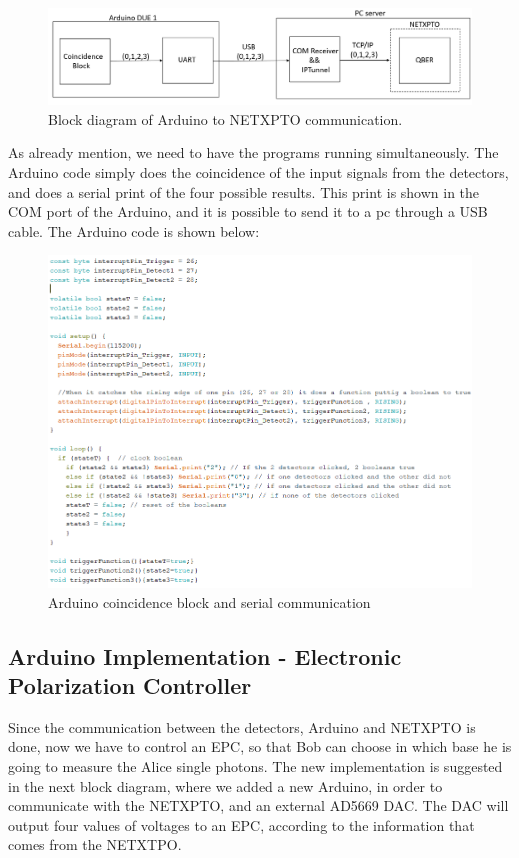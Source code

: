 \begin{refsection}
	\begin{figure}[H]
		\centering
		\includegraphics[width=1.1\linewidth]{./sdf/arduino_quantum_rx/figures/PC.png}
		\caption{Block diagram of Arduino to NETXPTO communication.}
		\label{fig:netxpto}
	\end{figure}
	

	As already mention, we need to have the programs running simultaneously. The Arduino code simply does the coincidence of the input signals from the detectors, and does a serial print of the four possible results. This print is shown in the COM port of the Arduino, and it is possible to send it to a pc through a USB cable. The Arduino code is shown below:
	
	\begin{figure}[H]
		\centering
		\includegraphics[width=0.85\linewidth]{./sdf/arduino_quantum_rx/figures/arduinoComPC.PNG}
		\caption{Arduino coincidence block and serial communication}
		\label{montage}
		
	\end{figure}

	\clearpage
	
	\subsection{Arduino Implementation - Electronic Polarization Controller }
	Since the communication between the detectors, Arduino and NETXPTO is done, now we have to control an EPC, so that Bob can choose in which base he is going to measure the Alice single photons. The new implementation is suggested in the next block diagram, where we added a new Arduino, in order to communicate with the NETXPTO, and an external AD5669 DAC. The DAC will output four values of voltages to an EPC, according to the information that comes from the NETXTPO.
	

\end{refsection}
